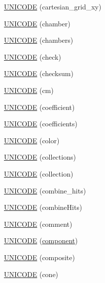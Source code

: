 \begin{DoxyCompactItemize}
\item 
\hyperlink{namespace_d_d4hep_1_1_x_m_l_a2ec5a989120161c52e0659d9b4e7d9e8}{U\+N\+I\+C\+O\+DE} (cartesian\+\_\+grid\+\_\+xy)
\item 
\hyperlink{namespace_d_d4hep_1_1_x_m_l_ab274d20a64d529882b50d0d945f0b805}{U\+N\+I\+C\+O\+DE} (chamber)
\item 
\hyperlink{namespace_d_d4hep_1_1_x_m_l_a99ab5779948f25c8ee910b070f6ecb23}{U\+N\+I\+C\+O\+DE} (chambers)
\item 
\hyperlink{namespace_d_d4hep_1_1_x_m_l_a7161a93c1987ffc580d2f9f4fb4595a0}{U\+N\+I\+C\+O\+DE} (check)
\item 
\hyperlink{namespace_d_d4hep_1_1_x_m_l_ab5dce0c9214c49dd9ca34dcf32ba705b}{U\+N\+I\+C\+O\+DE} (checksum)
\item 
\hyperlink{namespace_d_d4hep_1_1_x_m_l_abcb9f224c739bb6fe5fba75a17bdc7fa}{U\+N\+I\+C\+O\+DE} (cm)
\item 
\hyperlink{namespace_d_d4hep_1_1_x_m_l_abcd7b7f159f83d6bc4b58e541fe93e65}{U\+N\+I\+C\+O\+DE} (coefficient)
\item 
\hyperlink{namespace_d_d4hep_1_1_x_m_l_a85267280422f2a419836796e52ee004c}{U\+N\+I\+C\+O\+DE} (coefficients)
\item 
\hyperlink{namespace_d_d4hep_1_1_x_m_l_a6824b3eb8b25483b4378bfec45dc4c43}{U\+N\+I\+C\+O\+DE} (color)
\item 
\hyperlink{namespace_d_d4hep_1_1_x_m_l_a126c380ca9d4874360e355444af84a16}{U\+N\+I\+C\+O\+DE} (collections)
\item 
\hyperlink{namespace_d_d4hep_1_1_x_m_l_a81a5be6fb130ad33fc6d9de6167a164b}{U\+N\+I\+C\+O\+DE} (collection)
\item 
\hyperlink{namespace_d_d4hep_1_1_x_m_l_afcba8763ae22bcb136e542df4a675961}{U\+N\+I\+C\+O\+DE} (combine\+\_\+hits)
\item 
\hyperlink{namespace_d_d4hep_1_1_x_m_l_af27bc0e0d5d74830c24df020c5c3f9af}{U\+N\+I\+C\+O\+DE} (combine\+Hits)
\item 
\hyperlink{namespace_d_d4hep_1_1_x_m_l_af29147620c371649c7ac11e1ccb6f793}{U\+N\+I\+C\+O\+DE} (comment)
\item 
\hyperlink{namespace_d_d4hep_1_1_x_m_l_a92f6052499293d0e156273bda2b44c3c}{U\+N\+I\+C\+O\+DE} (\hyperlink{namespace_d_d4hep_a9bd7c6fd6580a172a3d0a09eb3ea4793}{component})
\item 
\hyperlink{namespace_d_d4hep_1_1_x_m_l_a75b17b68963b5127df7e5e66bc496df0}{U\+N\+I\+C\+O\+DE} (composite)
\item 
\hyperlink{namespace_d_d4hep_1_1_x_m_l_a64329346b285d17ed4eced10c746a380}{U\+N\+I\+C\+O\+DE} (cone)

\end{DoxyCompactItemize}
